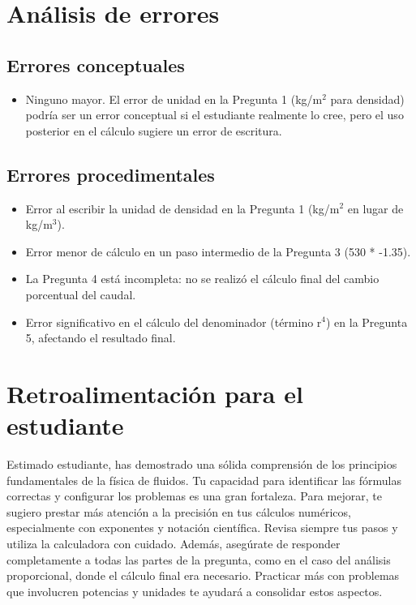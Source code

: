 \documentclass[11pt,a4paper]{article}
\begin{document}
\section*{Análisis de errores}

\subsection*{Errores conceptuales}
\begin{itemize}[leftmargin=1.5em, itemsep=2pt]
  \item Ninguno mayor. El error de unidad en la Pregunta 1 (kg/m$^{2}$ para densidad) podría ser un error conceptual si el estudiante realmente lo cree, pero el uso posterior en el cálculo sugiere un error de escritura.
\end{itemize}

\subsection*{Errores procedimentales}
\begin{itemize}[leftmargin=1.5em, itemsep=2pt]
  \item Error al escribir la unidad de densidad en la Pregunta 1 (kg/m$^{2}$ en lugar de kg/m$^{3}$).
  \item Error menor de cálculo en un paso intermedio de la Pregunta 3 (530 * -1.35).
  \item La Pregunta 4 está incompleta: no se realizó el cálculo final del cambio porcentual del caudal.
  \item Error significativo en el cálculo del denominador (término r$^{4}$) en la Pregunta 5, afectando el resultado final.
\end{itemize}

\section*{Retroalimentación para el estudiante}
\begin{tcolorbox}[cajaRecomendacion, title={Dirigido a: ybramaris maribao 36150392}]
Estimado estudiante, has demostrado una sólida comprensión de los principios fundamentales de la física de fluidos. Tu capacidad para identificar las fórmulas correctas y configurar los problemas es una gran fortaleza. Para mejorar, te sugiero prestar más atención a la precisión en tus cálculos numéricos, especialmente con exponentes y notación científica. Revisa siempre tus pasos y utiliza la calculadora con cuidado. Además, asegúrate de responder completamente a todas las partes de la pregunta, como en el caso del análisis proporcional, donde el cálculo final era necesario. Practicar más con problemas que involucren potencias y unidades te ayudará a consolidar estos aspectos.
\end{tcolorbox}
\end{document}
